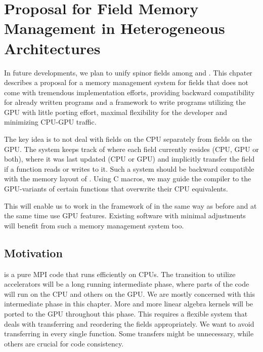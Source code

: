 \chapter{Proposal for Field Memory Management in Heterogeneous Architectures}
\label{ch:p1:memory}


In future developments, we plan to unify spinor fields among \openqxd and \quda.
This chpater describes a proposal for a memory management system for fields that does not come with tremendous implementation efforts, providing backward compatibility for already written programs and a framework to write programs utilizing the GPU with little porting effort, maximal flexibility for the developer and minimizing CPU-GPU traffic.

The key idea is to not deal with fields on the CPU separately from fields on the GPU.
The system  keeps track of where each field currently resides (CPU, GPU or both), where it was last updated (CPU or GPU) and implicitly transfer the field if a function reads or writes to it.
Such a system should be backward compatible with the memory layout of \openqxd.
Using C macros, we may guide the compiler to the GPU-variants of certain functions that overwrite their CPU equivalents.

This will enable us to work in the framework of \openqxd in the same way as before and at the same time use GPU features. 
Existing software with minimal adjustments will benefit from such a memory management system too.

\section{Motivation}

\Openqxd is a pure MPI code that runs efficiently on CPUs.
The transition to utilize accelerators will be a long running intermediate phase, where parts of the code will run on the CPU and others on the GPU.
We are mostly concerned with this intermediate phase in this chapter.
More and more linear algebra kernels will be ported to the GPU throughout this phase.
This requires a flexible system that deals with transferring and reordering the fields appropriately.
We want to avoid transferring in every single function.
Some transfers might be unnecessary, while others are crucial for code consistency.

